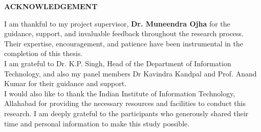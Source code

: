 \begin{center}
    {\large\bfseries ACKNOWLEDGEMENT}
\end{center}

\begin{spacing}{1.5}
I am thankful to my project supervisor, \textbf{Dr. Muneendra Ojha} for the guidance, support, and invaluable feedback throughout the research process. Their expertise, encouragement, and patience have been instrumental in the completion of this thesis.\\[10pt] 
 I am grateful to Dr. K.P. Singh, Head of the Department of Information Technology, and also my panel members Dr Kavindra Kandpal and Prof. Anand Kumar for their guidance and support.\\[10pt]
 I would also like to thank the Indian Institute of Information Technology, Allahabad for providing the necessary resources and facilities to conduct this research. I am deeply grateful to the participants who generously shared their time and personal information to make this study possible. \\[30 pt]
\end{spacing}

\begin{spacing}{2.0}
\begin{flushright}
    \begin{minipage}{0.5\textwidth}
        \flushright \vspace{60 pt}
        \underline{\hspace{6cm}} \\
         \\[80pt]
    \end{minipage}
\end{flushright}
\end{spacing}
\newpage


